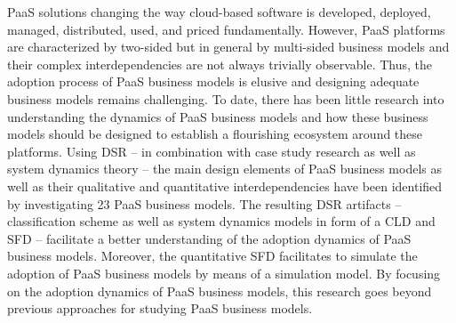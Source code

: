 
\ac{PaaS} solutions changing the way cloud-based software is developed, deployed, managed, distributed, used, and priced fundamentally. However, \ac{PaaS} platforms are characterized by two-sided but in general by multi-sided business models and their complex interdependencies are not always trivially observable. Thus, the adoption process of \ac{PaaS} business models is elusive and designing adequate business models remains challenging. To date, there has been little research into understanding the dynamics of \ac{PaaS} business models and how these business models should be designed to establish a flourishing ecosystem around these platforms. Using \ac{DSR} -- in combination with case study research as well as system dynamics theory -- the main design elements of \ac{PaaS} business models as well as their qualitative and quantitative interdependencies have been identified by investigating 23 PaaS business models. The resulting \ac{DSR} artifacts -- classification scheme as well as system dynamics models in form of a \ac{CLD} and \ac{SFD} -- facilitate a better understanding of the adoption dynamics of \ac{PaaS} business models. Moreover, the quantitative \ac{SFD} facilitates to simulate the adoption of \ac{PaaS} business models by means of a simulation model. By focusing on the adoption dynamics of \ac{PaaS} business models, this research goes beyond previous approaches for studying \ac{PaaS} business models.


\vspace*{5mm}

